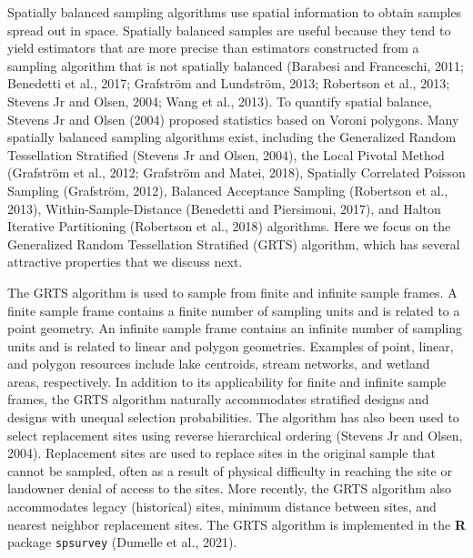 \documentclass[]{elsarticle} %
\begin{document}
Spatially balanced sampling algorithms use spatial information to obtain
samples spread out in space. Spatially balanced samples are useful
because they tend to yield estimators that are more precise than
estimators constructed from a sampling algorithm that is not spatially
balanced (Barabesi and Franceschi, 2011; Benedetti et al., 2017;
Grafström and Lundström, 2013; Robertson et al., 2013; Stevens Jr and
Olsen, 2004; Wang et al., 2013). To quantify spatial balance, Stevens Jr
and Olsen (2004) proposed statistics based on Voroni polygons. Many
spatially balanced sampling algorithms exist, including the Generalized
Random Tessellation Stratified (Stevens Jr and Olsen, 2004), the Local
Pivotal Method (Grafström et al., 2012; Grafström and Matei, 2018),
Spatially Correlated Poisson Sampling (Grafström, 2012), Balanced
Acceptance Sampling (Robertson et al., 2013), Within-Sample-Distance
(Benedetti and Piersimoni, 2017), and Halton Iterative Partitioning
(Robertson et al., 2018) algorithms. Here we focus on the Generalized
Random Tessellation Stratified (GRTS) algorithm, which has several
attractive properties that we discuss next.

The GRTS algorithm is used to sample from finite and infinite sample
frames. A finite sample frame contains a finite number of sampling units
and is related to a point geometry. An infinite sample frame contains an
infinite number of sampling units and is related to linear and polygon
geometries. Examples of point, linear, and polygon resources include
lake centroids, stream networks, and wetland areas, respectively. In
addition to its applicability for finite and infinite sample frames, the
GRTS algorithm naturally accommodates stratified designs and designs
with unequal selection probabilities. The algorithm has also been used
to select replacement sites using reverse hierarchical ordering (Stevens
Jr and Olsen, 2004). Replacement sites are used to replace sites in the
original sample that cannot be sampled, often as a result of physical
difficulty in reaching the site or landowner denial of access to the
sites. More recently, the GRTS algorithm also accommodates legacy
(historical) sites, minimum distance between sites, and nearest neighbor
replacement sites. The GRTS algorithm is implemented in the
\textbf{\textsf{R}} package \texttt{spsurvey} (Dumelle et al., 2021).
\end{document}
